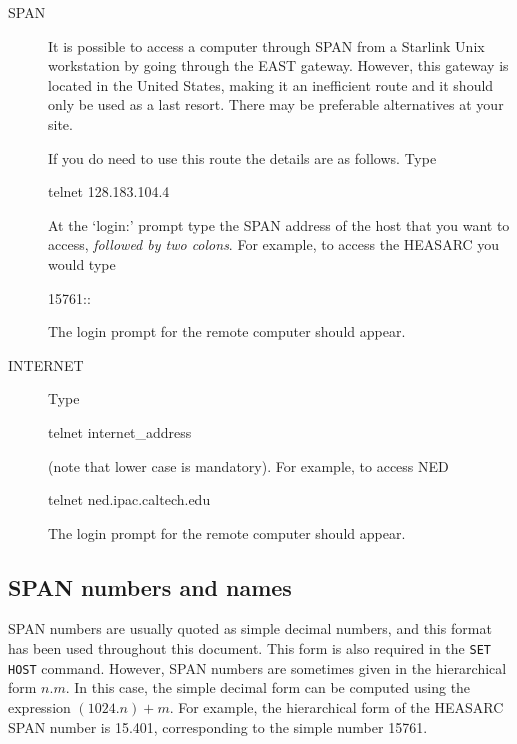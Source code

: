 \documentclass[twoside,11pt,nolof]{starlink}
\begin{document}
\begin{description}

  \item[SPAN] It is possible to access a computer through SPAN from a
   Starlink Unix workstation by going through the EAST gateway. However,
   this gateway is located in the United States, making it an
   inefficient route and it should only be used as a last resort. There
   may be preferable alternatives at your site.

   If you do need to use this route the details are as follows. Type

  \begin{terminalv}
    telnet 128.183.104.4
  \end{terminalv}

   At the `login:' prompt type the SPAN address of the host that you
   want to access, \textit{followed by two colons}. For example, to access
   the HEASARC you would type

  \begin{terminalv}
    15761::
  \end{terminalv}

   The login prompt for the remote computer should appear.

  \item[INTERNET] Type

  \begin{terminalv}
    telnet  internet_address
  \end{terminalv}

   (note that lower case is mandatory). For example, to access NED

  \begin{terminalv}
    telnet  ned.ipac.caltech.edu
  \end{terminalv}

   The login prompt for the remote computer should appear.

\end{description}

\subsection{SPAN numbers and names}

SPAN numbers are usually quoted as simple decimal numbers, and this
format has been used throughout this document. This form is also
required in the \verb-SET HOST- command. However, SPAN numbers are
sometimes given in the hierarchical form $n.m$. In this case, the
simple decimal form can be computed using the expression
$(1024.n) + m$. For example, the hierarchical form of the HEASARC SPAN
number is 15.401, corresponding to the simple number 15761.
\end{document}
